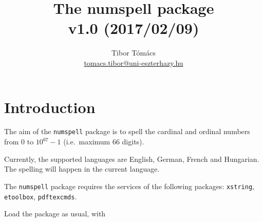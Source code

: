 \documentclass{article}
\newcommand{\commandinline}{\lstinline[
literate={<}{{$\langle$}}1{>}{{$\rangle$}}1,
delim={[is][\color{green!50!black}\normalfont\itshape]{!}{!}},
basicstyle=\color{blue!80!black}\ttfamily,
columns=fullflexible,
keepspaces]}
\begin{document}
\title{The {\bfseries\sffamily numspell} package\\{\large v1.0 (2017/02/09)}}
\author{Tibor Tómács\\{\normalsize\url{tomacs.tibor@uni-eszterhazy.hu}}}
\date{}
\maketitle

\section{Introduction}
The aim of the \texttt{numspell} package is to spell the cardinal and ordinal numbers from 0 to $10^{67}-1$ (i.e.~maximum 66 digits).

Currently, the supported languages are English, German, French and Hungarian.
The spelling will happen in the current language.

The \texttt{numspell} package requires the services of the following packages: \texttt{xstring}, \texttt{etoolbox}, \texttt{pdftexcmds}.

Load the package as usual, with
\begin{flushleft}
\commandinline|\usepackage{numspell}|
\end{flushleft}
\end{document}
